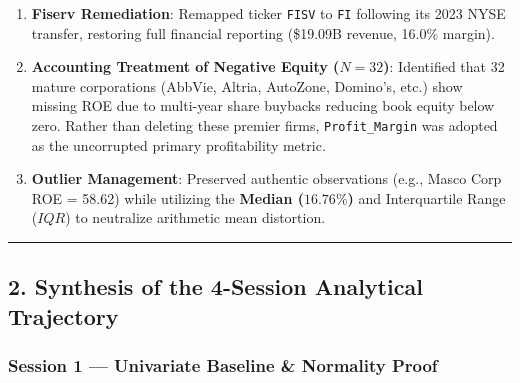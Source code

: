 \documentclass[
]{article}
\providecommand{\tightlist}{%
  \setlength{\itemsep}{0pt}\setlength{\parskip}{0pt}}
\begin{document}
\begin{enumerate}
\def\labelenumi{\arabic{enumi}.}
\tightlist
\item
  \textbf{Fiserv Remediation}: Remapped ticker \texttt{FISV} to
  \texttt{FI} following its 2023 NYSE transfer, restoring full financial
  reporting (\$19.09B revenue, 16.0\% margin).
\item
  \textbf{Accounting Treatment of Negative Equity (\(N = 32\))}:
  Identified that 32 mature corporations (AbbVie, Altria, AutoZone,
  Domino's, etc.) show missing ROE due to multi-year share buybacks
  reducing book equity below zero. Rather than deleting these premier
  firms, \texttt{Profit\_Margin} was adopted as the uncorrupted primary
  profitability metric.
\item
  \textbf{Outlier Management}: Preserved authentic observations (e.g.,
  Masco Corp ROE = 58.62) while utilizing the \textbf{Median
  (\(16.76\%\))} and Interquartile Range (\(IQR\)) to neutralize
  arithmetic mean distortion.
\end{enumerate}

\begin{center}\rule{0.5\linewidth}{0.5pt}\end{center}

\subsection{2. Synthesis of the 4-Session Analytical
Trajectory}\label{synthesis-of-the-4-session-analytical-trajectory}

\subsubsection{Session 1 --- Univariate Baseline \& Normality
Proof}\label{session-1-univariate-baseline-normality-proof}
\end{document}
